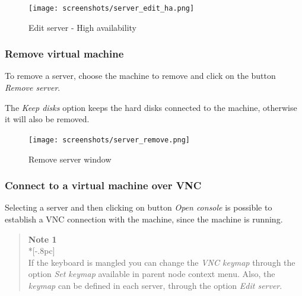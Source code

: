 \begin{description}
		\begin{figure}[H]
        		\begin{center}
		        \texttt{[image: screenshots/server\_edit\_ha.png]}
        		\caption{Edit server - High availability}
	        	\label{fig:server_edit_ha}
	        	\end{center}
		\end{figure}

\end{description}



\subsubsection{Remove virtual machine}
\label{sec:remove_server}
To remove a server, choose the machine to remove and click on the button \emph{Remove server}.

The \emph{Keep disks} option keeps the hard disks connected to the machine, otherwise it will also be removed.
		
\begin{figure}[H]
	\begin{center}
	\texttt{[image: screenshots/server\_remove.png]}
	\caption{Remove server window}
	\label{fig:server_remove}
	\end{center}
\end{figure}

\subsubsection{Connect to a virtual machine over VNC}
\label{sec:open_vnc}

Selecting a server and then clicking on button \emph{Open console} is possible to establish a VNC connection with the machine, since the machine is running.

\begin{quote}
	{\large \bf Note 1} \\*[-.8pc]
	\underline{\hspace{6in}} \\
    If the keyboard is mangled you can change the \emph{VNC keymap} through the option \emph{Set keymap} available in parent node context menu.
    Also, the \emph{keymap} can be defined in each server, through the option \emph{Edit server}.
\end{quote}

